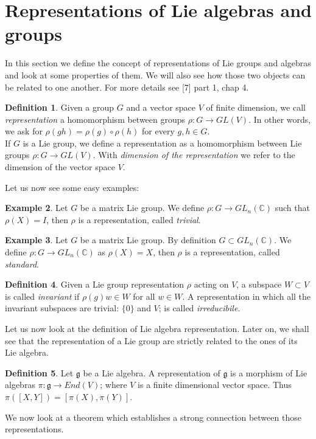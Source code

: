 \documentclass[12pt,a4paper]{report}
\theoremstyle{definition}
\newtheorem{Def}{Definition}[chapter]
\theoremstyle{Theorem}
\theoremstyle{definition}
\newtheorem{Ex}[Def]{Example}
\theoremstyle{definition}
\begin{document}
		\section{Representations of Lie algebras and groups}
		In this section we define the concept of representations of Lie groups and algebras and look at some properties of them. We will also see how those two objects can be related to one another. For more details see [7] part 1, chap 4.
		\begin{Def}
			Given a group $G$ and a vector space $V$ of finite dimension, we call \textit{representation} a homomorphism between groups $\rho:G\rightarrow GL(V)$. In other words, we ask for $\rho(gh)=\rho(g)\circ\rho(h)$ for every $g,h\in G$.\\
			If $G$ is a Lie group, we define a representation as a homomorphism between Lie groups $\rho:G\rightarrow GL(V)$. With \textit{dimension of the representation} we refer to the dimension of the vector space $V$.
		\end{Def}Let us now see some easy examples:
		\begin{Ex}
			Let $G$ be a matrix Lie group. We define $\rho: G\rightarrow GL_n(\mathbb{C})$ such that $\rho(X)=I$, then $\rho$ is a representation, called \textit{trivial}. 
		\end{Ex}
		\begin{Ex}
			Let $G$ be a matrix Lie group. By definition $G\subset GL_n(\mathbb{C})$. We define $\rho: G\rightarrow GL_n(\mathbb{C})$ as $\rho(X)=X$, then $\rho$ is a representation, called \textit{standard}. 
		\end{Ex}
		\begin{Def}
			Given a Lie group representation $\rho$ acting on $V$, a subspace $W\subset V$ is called \textit{invariant} if $\rho(g)w\in W$ for all $w\in W$.
			A representation in which all the invariant subspaces are trivial: $\{0\}$ and $V$; is called \textit{irreducibile}.
		\end{Def}
		Let us now look at the definition of Lie algebra representation. Later on, we shall see that the representation of a Lie group are strictly related to the ones of its Lie algebra.
		\begin{Def}
			Let $\mathfrak{g}$ be a Lie algebra. A representation of $\mathfrak{g}$ is a morphism of Lie algebras $\pi:\mathfrak{g}\rightarrow End(V)$; where $V$ is a finite dimensional vector space. Thus $\pi([X,Y])=[\pi(X),\pi(Y)]$.
		\end{Def}
		We now look at a theorem which establishes a strong connection between those representations.
\end{document}
